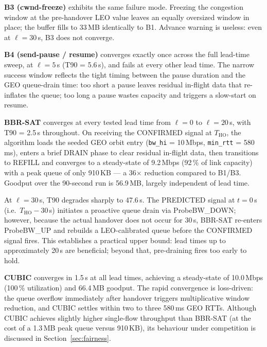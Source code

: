 \textbf{B3 (cwnd-freeze)} exhibits the same failure mode.
Freezing the congestion window at the pre-handover LEO value leaves an
equally oversized window in place; the buffer fills to 33\,MB
identically to B1.
Advance warning is useless: even at $\ell = 30$\,s, B3 does not converge.

\textbf{B4 (send-pause / resume)} converges exactly once across the full
lead-time sweep, at $\ell = 5$\,s (T90 = 5.6\,s), and fails at every
other lead time.
The narrow success window reflects the tight timing between the pause
duration and the GEO queue-drain time: too short a pause leaves residual
in-flight data that re-inflates the queue; too long a pause wastes capacity
and triggers a slow-start on resume.

\textbf{BBR-SAT} converges at every tested lead time from $\ell = 0$ to
$\ell = 20$\,s, with T90 = 2.5\,s throughout.
On receiving the CONFIRMED signal at $T_\mathrm{HO}$, the algorithm
loads the seeded GEO orbit entry (\texttt{bw\_hi} = 10\,Mbps, \texttt{min\_rtt}
= 580\,ms), enters a brief DRAIN phase to clear residual in-flight data,
then transitions to REFILL and converges to a steady-state of 9.2\,Mbps
(92\,\% of link capacity) with a peak queue of only 910\,KB --- a
36$\times$ reduction compared to B1/B3.
Goodput over the 90-second run is 56.9\,MB, largely independent of lead time.

At $\ell = 30$\,s, T90 degrades sharply to 47.6\,s.
The PREDICTED signal at $t = 0$\,s (i.e.\ $T_\mathrm{HO} - 30$\,s)
initiates a proactive queue drain via ProbeBW\_DOWN; however, because
the actual handover does not occur for 30\,s, BBR-SAT re-enters
ProbeBW\_UP and rebuilds a LEO-calibrated queue before the CONFIRMED
signal fires.
This establishes a practical upper bound: lead times up to approximately
20\,s are beneficial; beyond that, pre-draining fires too early to hold.

\textbf{CUBIC} converges in 1.5\,s at all lead times, achieving a
steady-state of 10.0\,Mbps (100\,\% utilization) and 66.4\,MB goodput.
The rapid convergence is loss-driven: the queue overflow immediately after
handover triggers multiplicative window reduction, and CUBIC settles within
two to three 580\,ms GEO RTTs.
Although CUBIC achieves slightly higher single-flow throughput than
BBR-SAT (at the cost of a 1.3\,MB peak queue versus 910\,KB), its
behaviour under competition is discussed in Section~\ref{sec:fairness}.

